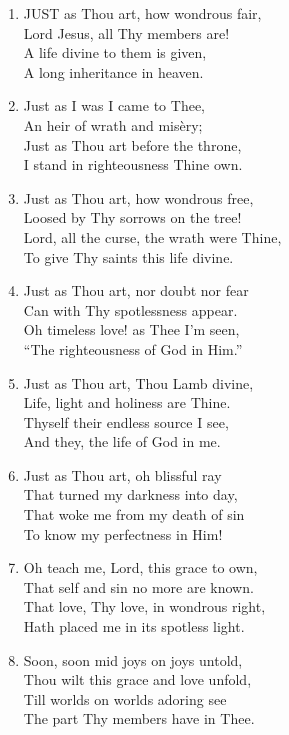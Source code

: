\begin{enumerate}
    \item JUST as Thou art, how wondrous fair, \\
        Lord Jesus, all Thy members are! \\
        A life divine to them is given, \\
        A long inheritance in heaven.

    \item Just as I was I came to Thee, \\
        An heir of wrath and mis\`ery; \\
        Just as Thou art before the throne, \\
        I stand in righteousness Thine own.

    \item Just as Thou art, how wondrous free, \\
        Loosed by Thy sorrows on the tree! \\
        Lord, all the curse, the wrath were Thine, \\
        To give Thy saints this life divine.

    \item Just as Thou art, nor doubt nor fear \\
        Can with Thy spotlessness appear. \\
        Oh timeless love! as Thee I'm seen, \\
        ``The righteousness of God in Him.''

    \item Just as Thou art, Thou Lamb divine, \\
        Life, light and holiness are Thine. \\
        Thyself their endless source I see, \\
        And they, the life of God in me.

    \item Just as Thou art, oh blissful ray \\
        That turned my darkness into day, \\
        That woke me from my death of sin \\
        To know my perfectness in Him!

    \item Oh teach me, Lord, this grace to own, \\
        That self and sin no more are known. \\
        That love, Thy love, in wondrous right, \\
        Hath placed me in its spotless light.

    \item Soon, soon mid joys on joys untold, \\
        Thou wilt this grace and love unfold, \\
        Till worlds on worlds adoring see \\
        The part Thy members have in Thee.

\end{enumerate}
